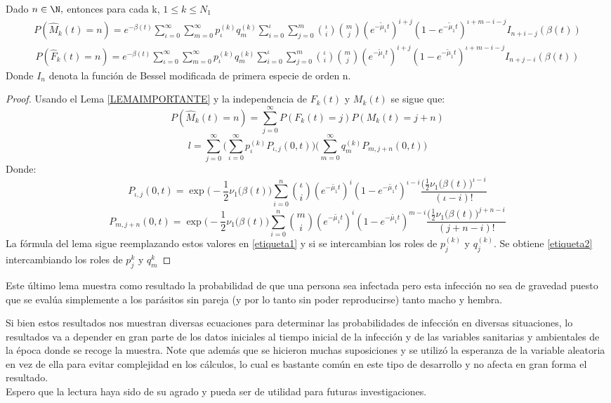 \label{LEMAIMPORTANTE}
\begin{Lem}
    Dado $n\in\N,$ entonces para cada k, $1\leq k\leq N_1$
    \begin{eqnarray}
        P(\hat{M}_k(t)=n)=e^{-\beta(t)}\sum_{\iota=0}^\infty\sum_{m=0}^\infty p_{\iota}^{(k)} q_m^{(k)}\sum_{i=0}^\iota\sum_{j=0}^m{\iota\choose i}{m\choose j} (e^{-\tilde{\mu}_1t})^{i+j}(1-e^{-\tilde{\mu}_1t})^{\iota+m-i-j}I_{n+i-j}(\beta(t))
        \label{etiqueta1}
    \end{eqnarray}
    \begin{eqnarray}
        P(\hat{F}_k(t)=n)=e^{-\beta(t)}\sum_{\iota=0}^\infty\sum_{m=0}^\infty p_{\iota}^{(k)} q_m^{(k)}\sum_{i=0}^\iota\sum_{j=0}^m{\iota\choose i}{m\choose j} (e^{-\tilde{\mu}_1t})^{i+j}(1-e^{-\tilde{\mu}_1t})^{\iota+m-i-j}I_{n+j-i}(\beta(t))
        \label{etiqueta2}
    \end{eqnarray}
    Donde $I_n$ denota la función de Bessel modificada de primera especie de orden n.
    \begin{proof}
        Usando el Lema \ref{LEMAIMPORTANTE} y la independencia de $F_k(t)$ y $M_k(t)$ se sigue que:
        $$P(\hat{M}_k(t)=n)=\sum_{j=0}^\infty P(F_k(t)=j)P(M_k(t)=j+n)$$
        $$l=\sum_{j=0}^\infty \big(\sum_{\iota=0}^\infty p_{\iota}^{(k)} P_{\iota ,j}(0,t) \big)\big(\sum_{m=0}^\infty q_m^{(k)}P_{m,j+n}(0,t)\big)$$
        Donde:
        $$P_{\iota ,j}(0,t)=\exp\big(-\frac{1}{2}\nu_1(\beta(t)\big)\sum_{i=0}^n{\iota \choose i}(e^{-\tilde{\mu_1}t})^i(1-e^{-\tilde{\mu_1}t})^{\iota-i}\frac{\big(\frac{1}{2}\nu_1(\beta(t)\big)^{\iota-i}}{(\iota-i)!}$$
        $$P_{m ,j+n}(0,t)=\exp\big(-\frac{1}{2}\nu_1(\beta(t)\big)\sum_{i=0}^n{m \choose i}(e^{-\tilde{\mu_1}t})^i(1-e^{-\tilde{\mu_1}t})^{m-i}\frac{\big(\frac{1}{2}\nu_1(\beta(t)\big)^{j+n-i}}{(j+n-i)!}$$
        La f\'ormula del lema sigue reemplazando estos valores en \ref{etiqueta1} y si se intercambian los roles de $p_j^{(k)}$ y $q_j^{(k)}$. Se obtiene \ref{etiqueta2} intercambiando los roles de $p_j^{k}$ y $q_m^{k}$
    \end{proof}
    Este último lema muestra como resultado la probabilidad de que una persona sea infectada pero esta infección no sea de gravedad puesto que se evalúa simplemente a los parásitos sin pareja (y por lo tanto sin poder reproducirse) tanto macho y hembra.
\end{Lem}
Si bien estos resultados nos muestran diversas ecuaciones para determinar las probabilidades de infección en diversas situaciones, lo resultados va a depender en gran parte de los datos iniciales al tiempo inicial de la infección y de las variables sanitarias y ambientales de la época donde se recoge la muestra. Note que además que se hicieron muchas suposiciones y se utilizó la esperanza de la variable aleatoria en vez de ella para evitar complejidad en los cálculos, lo cual es bastante común en este tipo de desarrollo y no afecta en gran forma el resultado.\\ Espero que la lectura haya sido de su agrado y pueda ser de utilidad para futuras investigaciones.